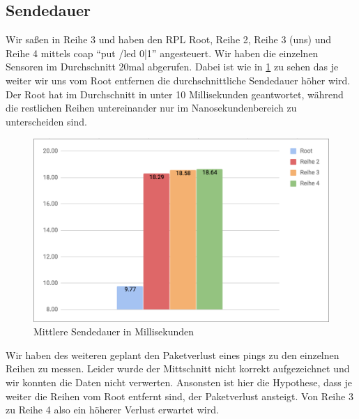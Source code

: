 \documentclass[paper=a4, fontsize=11pt]{scrartcl} %
\numberwithin{equation}{section} %
\numberwithin{figure}{section} %
\numberwithin{table}{section} %
\begin{document}
\subsection{Sendedauer}

Wir saßen in Reihe 3 und haben den RPL Root, Reihe 2, Reihe 3 (uns) und Reihe 4 mittels coap ``put /led 0|1'' angesteuert. Wir haben die einzelnen Sensoren im Durchschnitt 20mal abgerufen. Dabei ist wie in \ref{fig:sendedauer} zu sehen das je weiter wir uns vom Root entfernen die durchschnittliche Sendedauer höher wird. Der Root hat im Durchschnitt in unter 10 Millisekunden geantwortet, während die restlichen Reihen untereinander nur im Nanosekundenbereich zu unterscheiden sind.

\begin{figure}[H]
  \centering
  \includegraphics[width=0.7\linewidth]{imgs/put-led-response-time.png}
  \caption{Mittlere Sendedauer in Millisekunden}
  \label{fig:sendedauer}
\end{figure}

Wir haben des weiteren geplant den Paketverlust eines pings zu den einzelnen Reihen zu messen. Leider wurde der Mittschnitt nicht korrekt aufgezeichnet und wir konnten die Daten nicht verwerten. Ansonsten ist hier die Hypothese, dass je weiter die Reihen vom Root entfernt sind, der Paketverlust ansteigt. Von Reihe 3 zu Reihe 4 also ein höherer Verlust erwartet wird.
\end{document}
